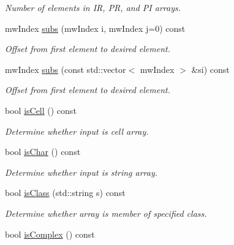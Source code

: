 \begin{DoxyCompactItemize}
\begin{DoxyCompactList}\small\item\em \-Number of elements in \-I\-R, \-P\-R, and \-P\-I arrays. \end{DoxyCompactList}\item 
mw\-Index \hyperlink{class_mx_array_aa109aabce4e800e91bb9510c918dba43}{subs} (mw\-Index i, mw\-Index j=0) const 
\begin{DoxyCompactList}\small\item\em \-Offset from first element to desired element. \end{DoxyCompactList}\item 
mw\-Index \hyperlink{class_mx_array_af1a8c8f57fbcc9ed804feb2cceb73709}{subs} (const std\-::vector$<$ mw\-Index $>$ \&si) const 
\begin{DoxyCompactList}\small\item\em \-Offset from first element to desired element. \end{DoxyCompactList}\item 
\hypertarget{class_mx_array_a81a6065a40c88135267358b7692af539}{bool \hyperlink{class_mx_array_a81a6065a40c88135267358b7692af539}{is\-Cell} () const }\label{class_mx_array_a81a6065a40c88135267358b7692af539}

\begin{DoxyCompactList}\small\item\em \-Determine whether input is cell array. \end{DoxyCompactList}\item 
\hypertarget{class_mx_array_ad2bc80522c0c1ba6bb149876854d55cc}{bool \hyperlink{class_mx_array_ad2bc80522c0c1ba6bb149876854d55cc}{is\-Char} () const }\label{class_mx_array_ad2bc80522c0c1ba6bb149876854d55cc}

\begin{DoxyCompactList}\small\item\em \-Determine whether input is string array. \end{DoxyCompactList}\item 
\hypertarget{class_mx_array_ae9be625e4356beaa22f467ce4c578611}{bool \hyperlink{class_mx_array_ae9be625e4356beaa22f467ce4c578611}{is\-Class} (std\-::string s) const }\label{class_mx_array_ae9be625e4356beaa22f467ce4c578611}

\begin{DoxyCompactList}\small\item\em \-Determine whether array is member of specified class. \end{DoxyCompactList}\item 
\hypertarget{class_mx_array_a0f570785df894e3481dd3e466af7fafe}{bool \hyperlink{class_mx_array_a0f570785df894e3481dd3e466af7fafe}{is\-Complex} () const }\label{class_mx_array_a0f570785df894e3481dd3e466af7fafe}


\end{DoxyCompactItemize}
